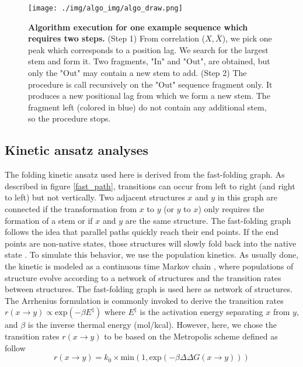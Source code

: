 \documentclass[a4paper,12pt]{article}
\begin{document}
\begin{figure}[htbp]
\centering
\texttt{[image: ./img/algo\_img/algo\_draw.png]}
\caption{\label{algo_desc}\textbf{Algorithm execution for one example sequence which requires two steps.} (Step 1) From correlation (\(X, \bar{X}\)), we pick one peak which corresponds to a position lag. We search for the largest stem and form it. Two fragments, "In" and "Out", are obtained, but only the "Out" may contain a new stem to add. (Step 2) The procedure is call recursively on the "Out" sequence fragment only. It produces a new positional lag from which we form a new stem. The fragment left (colored in blue) do not contain any additional stem, so the procedure stops.}
\end{figure}

\subsection*{Kinetic ansatz analyses}
\label{sec:org8561e6e}
The folding kinetic ansatz used here is derived from the fast-folding graph. As
described in figure \ref{fast_path}, transitions can occur from left to right (and
right to left) but not vertically. Two adjacent structures \(x\) and \(y\) in this
graph are connected if the transformation from \(x\) to \(y\) (or \(y\) to \(x\)) only
requires the formation of a stem or if \(x\) and \(y\) are the same structure. The
fast-folding graph follows the idea that parallel paths quickly reach their end
points. If the end points are non-native states, those structures will slowly
fold back into the native state \cite{pan97_foldin_rna_invol_paral_pathw}. To
simulate this behavior, we use the population kinetics. As usually done, the
kinetic is modeled as a continuous time Markov chain
\cite{lorenz20_effic_comput_base_probab_multi_rna_foldin}, where populations of
structure evolve according to a network of structures and the transition rates
between structures. The fast-folding graph is used here as network of
structures. The Arrhenius formulation is commonly invoked to derive the
transition rates \(r(x \rightarrow y) \propto \text{exp}(-\beta E^{\ddagger})\)
where \(E^{\ddagger}\) is the activation energy separating \(x\) from \(y\), and
\(\beta\) is the inverse thermal energy (mol/kcal). However, here, we chose the
transition rates \(r(x\rightarrow y)\) to be based on the Metropolis scheme
defined as follow
\begin{equation}
r(x\rightarrow y) = k_0 \times \text{min}(1, \text{exp}(-\beta \Delta \Delta G(x\rightarrow y)))
\end{equation}
\end{document}
